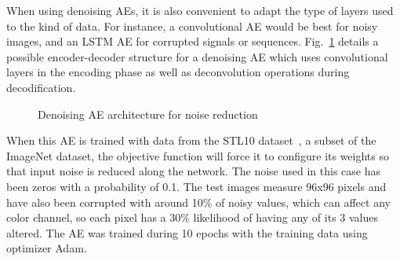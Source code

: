 When using denoising AEs, it is also convenient to adapt the type of layers used to the kind of data. For instance, a convolutional AE would be best for noisy images, and an LSTM AE for corrupted signals or sequences. Fig.~\ref{fig:graph-denoising} details a possible encoder-decoder structure for a denoising AE which uses convolutional layers in the encoding phase as well as deconvolution operations during decodification.

\begin{figure}[ht]
    \centering\small
    \caption{Denoising AE architecture for noise reduction}
    \label{fig:graph-denoising}
\end{figure}

When this AE is trained with data from the STL10 dataset~, a subset of the ImageNet dataset, the objective function will force it to configure its weights so that input noise is reduced along the network. The noise used in this case has been zeros with a probability of 0.1. The test images measure 96x96 pixels and have also been corrupted with around 10\% of noisy values, which can affect any color channel, so each pixel has a 30\% likelihood of having any of its 3 values altered. The AE was trained during 10 epochs with the training data using optimizer Adam. 

